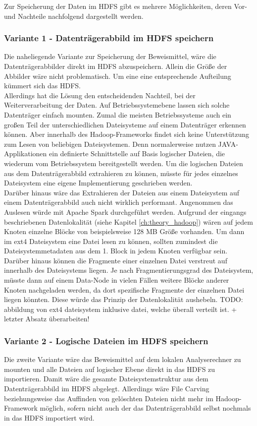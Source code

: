 \noindent
Zur Speicherung der Daten im HDFS gibt es mehrere Möglichkeiten, deren Vor- und Nachteile nachfolgend dargestellt werden.

\subsubsection{Variante 1 - Datenträgerabbild im HDFS speichern}

Die naheliegende Variante zur Speicherung der Beweismittel, wäre die Datenträgerabbilder direkt im HDFS abzuspeichern. Allein die Größe der Abbilder wäre nicht problematisch. Um eine eine entsprechende Aufteilung kümmert sich das HDFS.\\ Allerdings hat die Lösung den entscheidenden Nachteil, bei der Weiterverarbeitung der Daten. Auf Betriebssystemebene lassen sich solche Datenträger einfach mounten. Zumal die meisten Betriebssysteme auch ein großen Teil der unterschiedlichen Dateisysteme auf einem Datenträger erkennen können. Aber innerhalb des Hadoop-Frameworks findet sich keine Unterstützung zum Lesen von beliebigen Dateisystemen. Denn normalerweise nutzen JAVA-Applikationen ein definierte Schnittstelle auf Basis logischer Dateien, die wiederum vom Betriebssystem bereitgestellt werden. Um die logischen Dateien aus dem Datenträgerabbild extrahieren zu können, müsste für jedes einzelnes Dateisystem eine eigene Implementierung geschrieben werden.\\ 
Darüber hinaus wäre das Extrahieren der Dateien aus einem Dateisystem auf einem Datenträgerabbild auch nicht wirklich performant. Angenommen das Auslesen würde mit Apache Spark durchgeführt werden. Aufgrund der eingangs beschriebenen Datenlokalität (siehe Kapitel \ref{ch:theory_hadoop}) wären auf jedem Knoten einzelne Blöcke von beispielsweise 128 MB Größe vorhanden. Um dann im ext4 Dateisystem eine Datei lesen zu können, sollten zumindest die Dateisystemmetadaten aus dem 1. Block in jedem Knoten verfügbar sein. Darüber hinaus können die Fragmente einer einzelnen Datei verstreut auf innerhalb des Dateisystems liegen. Je nach Fragmentierungsgrad des Dateisystem, müsste dann auf einem Data-Node in vielen Fällen weitere Blöcke anderer Knoten nachgeladen werden, da dort spezifische Fragmente der einzelnen Datei liegen könnten. Diese würde das Prinzip der Datenlokalität aushebeln. TODO: abbildung von ext4 dateisystem inklusive datei, welche überall verteilt ist. + letzter Absatz überarbeiten!


\subsubsection{Variante 2 - Logische Dateien im HDFS speichern}
Die zweite Variante wäre das Beweismittel auf dem lokalen Analyserechner zu mounten und alle Dateien auf logischer Ebene direkt in das HDFS zu importieren. 
Damit wäre die gesamte Dateisystemstruktur aus dem Datenträgerabbild im HDFS abgelegt. Allerdings wäre File Carving beziehungsweise das Auffinden von gelöschten Dateien nicht mehr im Hadoop-Framework möglich, sofern nicht auch der das Datenträgerabbild selbst nochmals in das HDFS importiert wird.\\ 

